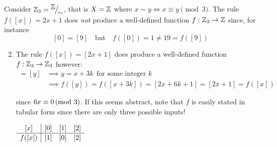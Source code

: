 \begin{examples}{}{}
	\exstart Consider $\mathbb{Z}_3={}^{\textstyle {\mathbb{Z}}}\!\big/_{\textstyle \!{\sim}}$, that is $X=\mathbb{Z}$ where $x\sim y\Longleftrightarrow x\equiv y\pmod 3$. The rule $f([x])=2x+1$ does \emph{not} produce a well-defined function $f:\mathbb{Z}_3\to\mathbb{Z}$ since, for instance
	\[
		[0]=[9]\quad \text{but}\quad f([0])=1\neq 19 =f([9])  
	\]
	
	\begin{enumerate}\setcounter{enumi}{1}
	  \item The rule $f([x])=[2x+1]$ does produce a well-defined function $f:\mathbb{Z}_3\to\mathbb{Z}_3$ however:
	  \begin{align*}
	  	[x]=[y]&\implies y=x+3k\ \ \text{for some integer $k$}\\
	  	&\implies f([y])=f([x+3k]) =[2x+6k+1] =[2x+1] =f([x])
	  \end{align*}
	  \begin{minipage}[t]{0.72\linewidth}\vspace{-8pt}
	  	since $6x\equiv 0\negthickspace\pmod{3}$. If this seems abstract, note that $f$ is easily stated in tabular form since there are only three possible inputs!
	  \end{minipage}
	  \hfill
	  \begin{minipage}[t]{0.25\linewidth}\vspace{-10pt}
	  	\hfill $\def\arraystretch{1.1}
	  	\begin{array}{c|ccc}
	  		[x]&[0]&[1]&[2]\\\hline
	  		f([x])&[1]&[0]&[2]
	  	\end{array}$
	  \end{minipage}


\end{enumerate}
\end{examples}
